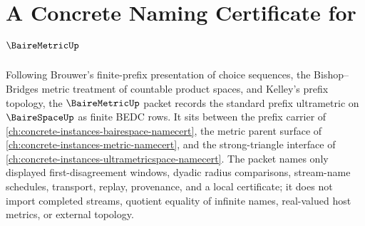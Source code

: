 \chapter{A Concrete Naming Certificate for $\BaireMetricUp$}
\label{ch:concrete-instances-bairemetric-namecert}

Following Brouwer's finite-prefix presentation of choice sequences, the Bishop--Bridges metric treatment of countable product spaces, and Kelley's prefix topology, the $\BaireMetricUp$ packet records the standard prefix ultrametric on $\BaireSpaceUp$ as finite BEDC rows. It sits between the prefix carrier of \autoref{ch:concrete-instances-bairespace-namecert}, the metric parent surface of \autoref{ch:concrete-instances-metric-namecert}, and the strong-triangle interface of \autoref{ch:concrete-instances-ultrametricspace-namecert}. The packet names only displayed first-disagreement windows, dyadic radius comparisons, stream-name schedules, transport, replay, provenance, and a local certificate; it does not import completed streams, quotient equality of infinite names, real-valued host metrics, or external topology.

